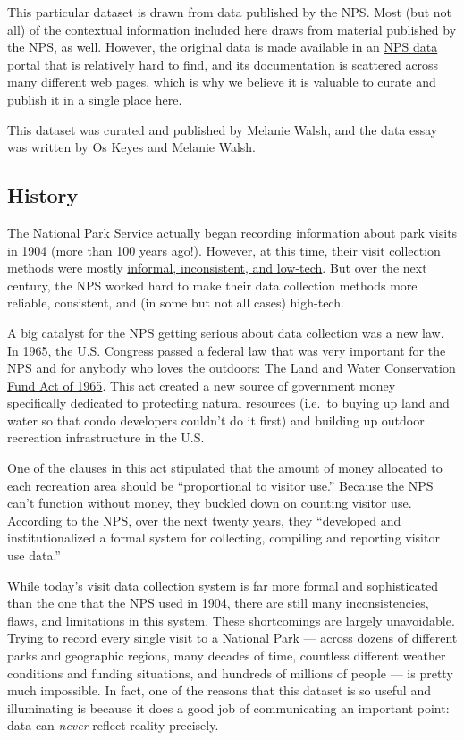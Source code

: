 \documentclass[
  letterpaper,
  DIV=11,
  numbers=noendperiod]{scrartcl}
\begin{document}
This particular dataset is drawn from data published by the NPS. Most
(but not all) of the contextual information included here draws from
material published by the NPS, as well. However, the original data is
made available in an \href{https://irma.nps.gov/Stats/}{NPS data portal}
that is relatively hard to find, and its documentation is scattered
across many different web pages, which is why we believe it is valuable
to curate and publish it in a single place here.

This dataset was curated and published by Melanie Walsh, and the data
essay was written by Os Keyes and Melanie Walsh.

\subsection{History}\label{history}

The National Park Service actually began recording information about
park visits in 1904 (more than 100 years ago!). However, at this time,
their visit collection methods were mostly
\href{https://www.nps.gov/subjects/socialscience/statistics-history.htm}{informal,
inconsistent, and low-tech}. But over the next century, the NPS worked
hard to make their data collection methods more reliable, consistent,
and (in some but not all cases) high-tech.

A big catalyst for the NPS getting serious about data collection was a
new law. In 1965, the U.S. Congress passed a federal law that was very
important for the NPS and for anybody who loves the outdoors:
\href{https://www.everycrsreport.com/reports/RL33531.html}{The Land and
Water Conservation Fund Act of 1965}. This act created a new source of
government money specifically dedicated to protecting natural resources
(i.e.~to buying up land and water so that condo developers couldn't do
it first) and building up outdoor recreation infrastructure in the U.S.

One of the clauses in this act stipulated that the amount of money
allocated to each recreation area should be
\href{https://www.nps.gov/subjects/socialscience/statistics-history.htm}{``proportional
to visitor use.''} Because the NPS can't function without money, they
buckled down on counting visitor use. According to the NPS, over the
next twenty years, they ``developed and institutionalized a formal
system for collecting, compiling and reporting visitor use data.''

While today's visit data collection system is far more formal and
sophisticated than the one that the NPS used in 1904, there are still
many inconsistencies, flaws, and limitations in this system. These
shortcomings are largely unavoidable. Trying to record every single
visit to a National Park --- across dozens of different parks and
geographic regions, many decades of time, countless different weather
conditions and funding situations, and hundreds of millions of people
--- is pretty much impossible. In fact, one of the reasons that this
dataset is so useful and illuminating is because it does a good job of
communicating an important point: data can \emph{never} reflect reality
precisely.
\end{document}
